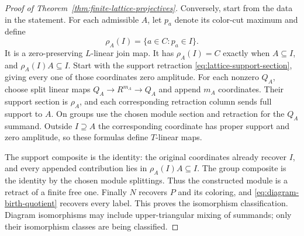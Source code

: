 \begin{proof}[Proof of Theorem~\ref{thm:finite-lattice-projectives}]
Conversely, start from the data in the statement. For each admissible
$A$, let $p_a$ denote its color-cut maximum and define
\begin{equation}\label{eq:admissible-functional}
 \rho_A(I)=\{a\in C:p_a\in I\}.
\end{equation}
It is a zero-preserving $L$-linear join map. It has
$\rho_A(I)=C$ exactly when $A\subseteq I$, and
$\rho_A(I)A\subseteq I$. Start with the support retraction
\eqref{eq:lattice-support-section}, giving every one of those
coordinates zero amplitude. For each nonzero $Q_A$, choose split
linear maps $Q_A\to R^{m_A}\to Q_A$ and append $m_A$ coordinates.
Their support section is $\rho_A$, and each corresponding retraction
column sends full support to $A$. On groups use the chosen module
section and retraction for the $Q_A$ summand. Outside $I\supseteq A$
the corresponding coordinate has proper support and zero amplitude,
so these formulas define $T$-linear maps.

The support composite is the identity: the original coordinates
already recover $I$, and every appended contribution lies in
$\rho_A(I)A\subseteq I$. The group composite is the identity by
the chosen module splittings. Thus the constructed module is a
retract of a finite free one. Finally $N$ recovers $P$ and its coloring,
and \eqref{eq:diagram-birth-quotient} recovers every label. This proves
the isomorphism classification. Diagram isomorphisms may include
upper-triangular mixing of summands; only their isomorphism classes
are being classified.
\end{proof}

